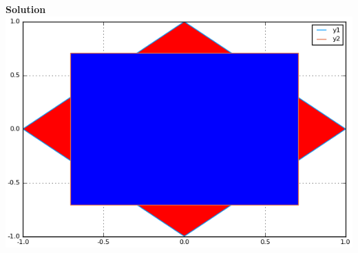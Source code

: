 \documentclass[]{article}
\begin{document}
\textbf{Solution} 
\hfill \break
\includegraphics[width=\textwidth,keepaspectratio]{problem3.png}
\end{document}
